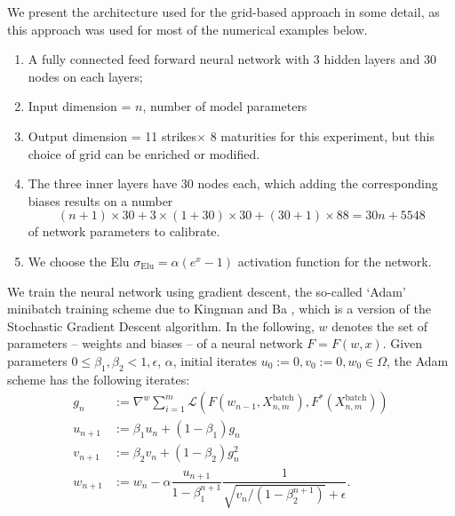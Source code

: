 \documentclass{article}
\theoremstyle{remark}
\begin{document}
We present the architecture used for the grid-based approach in some detail,
as this approach was used for most of the numerical examples below.
\begin{enumerate}
\item A fully connected feed forward neural network with 3 hidden layers
  and $30$ nodes on each layers;
\item Input dimension = $n$, number of  model parameters
\item Output dimension = 11 strikes$\times$ 8 maturities for this experiment, but this choice of grid can be enriched or modified.
\item The three inner layers have $30$ nodes each, which adding the
  corresponding biases results on a number $$(n+1)\times30+ 3\times
  (1+30)\times 30+(30+1)\times88=30 n+5548$$ of network parameters to
  calibrate.%
\item We choose the Elu $\sigma_{\mathrm{Elu}}=\alpha(e^x-1)$ activation
  function for the network.
\end{enumerate}


We train the neural network using gradient descent, the so-called `Adam'
minibatch training scheme due to Kingman and Ba \cite{KBAdam}, which is a
version of the Stochastic Gradient Descent algorithm. In the following, $w$ denotes the set of parameters --
weights and biases -- of a neural network $F = F(w,x)$.  Given parameters
$0 \leq \beta_{1}, \beta_{2} < 1, \epsilon$, $\alpha$, initial iterates
$u_{0} := 0, v_{0} := 0, w_{0}\in\Omega$, the Adam scheme has the following
iterates:
\begin{align*}
  g_{n} &  := \nabla^{w} \sum_{i = 1}^{m}
          \mathcal{L}\left(F(w_{n-1},X_{n,m}^{\text{batch}}),F^*(X_{n,m}^{\text{batch}})\right)\\ 
  u_{n+1} & := \beta_{1} u_{n} + (1 - \beta_{1})g_{n} \\
  v_{n+1} & := \beta_{2} v_{n} + (1 - \beta_{2}) g_{n}^{2} \\
  w_{n+1} & := w_{n} - \alpha \dfrac{u_{n+1}}{1 - \beta_{1}^{n+1}} \dfrac{1}{\sqrt{v_{n} / (1 - \beta_{2}^{n+1})} + \epsilon}.
\end{align*}
\end{document}
